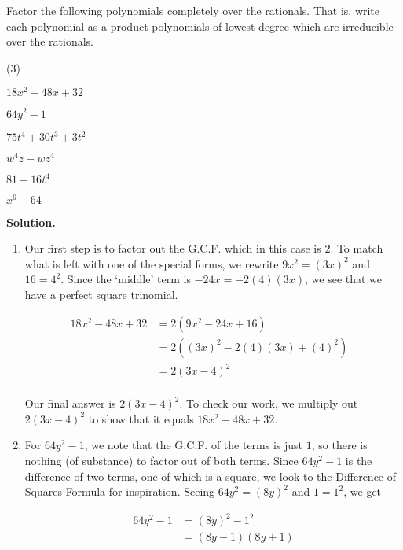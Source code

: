 \begin{ex}\label{FormulaFactoring}  Factor the following polynomials completely over the rationals.  That is, write each polynomial as a product polynomials of lowest degree which are irreducible over the rationals. 

\begin{tasks}(3)

\task  $18x^2 - 48x + 32$  

\task  $64y^2 - 1$ 

\task  $75t^4 + 30t^3 + 3t^2$

\task  $w^4 z - w z^4$

\task  \label{quadinform1} $81 - 16t^4$ 

\task  \label{quadinform2} $x^6 - 64$

\end{tasks}

{\bf Solution.}

\begin{enumerate}
\item  Our first step is to factor out the G.C.F. which in this case is $2$.  To match what is left with one of the special forms, we rewrite $9x^2 = (3x)^2$ and $16 = 4^2$. Since the `middle' term is $-24x = -2(4)(3x)$, we see that we have a perfect square trinomial.

\begin{align*}
18x^2 - 48x + 32 & = 2(9x^2 - 24x + 16) \tag{Factor out G.C.F.}\\
& = 2((3x)^2 - 2(4)(3x) + (4)^2) & \\
& = 2(3x-4)^2 \tag{Perfect Square Trinomial:  $a = 3x$, $b=4$} \\
\end{align*}

Our final answer is $2(3x-4)^2$.  To check our work, we multiply out $2(3x-4)^2$ to show that it equals $18x^2 - 48x + 32$.
 
\item  For $64y^2 - 1$, we note that the G.C.F. of the terms is just $1$, so there is nothing (of substance) to factor out of both terms. Since $64y^2 - 1$ is the difference of two terms, one of which is a square, we look to the Difference of Squares Formula for inspiration.   Seeing $64y^2 = (8y)^2$ and $1 = 1^2$, we get

\begin{align*}
64y^2 - 1 & = (8y)^2 - 1^2 \\
& = (8y-1)(8y+1) \tag{Difference of Squares, $a = 8y$, $b = 1$}
\end{align*}


\end{enumerate}
\end{ex}
